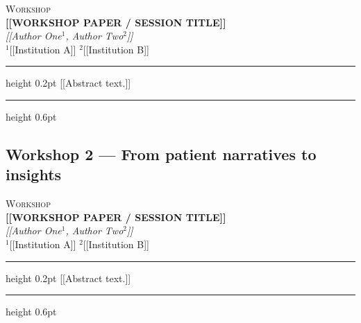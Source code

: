\documentclass[11pt]{article}
\newcommand{\abstractentry}[5]{%
  \vspace{0.6em}
  {\small\textsc{\color{healtacteal}#1}}\\[2pt]
  {\bfseries #2}\\[2pt]
  {\itshape #3}\\[1pt]
  {\small #4}
  \vspace{4pt}
  \hrule height 0.2pt
  \vspace{4pt}
  {\small #5}
  \vspace{1em}
  \hrule height 0.6pt
  \vspace{0.5em}
}
\begin{document}
\abstractentry
  {Workshop}
  {[[WORKSHOP PAPER / SESSION TITLE]]}
  {[[Author One$^1$, Author Two$^2$]]}
  {$^1$[[Institution A]] \quad $^2$[[Institution B]]}
  {[[Abstract text.]]}

\subsection{Workshop 2 — From patient narratives to insights}

\abstractentry
  {Workshop}
  {[[WORKSHOP PAPER / SESSION TITLE]]}
  {[[Author One$^1$, Author Two$^2$]]}
  {$^1$[[Institution A]] \quad $^2$[[Institution B]]}
  {[[Abstract text.]]}


\end{document}
